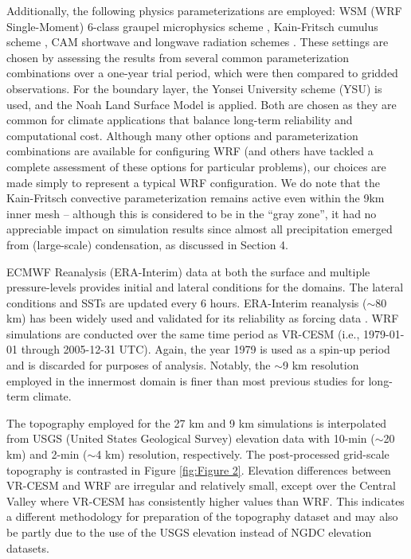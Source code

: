 Additionally, the following physics parameterizations are employed: WSM (WRF Single-Moment) 6-class graupel microphysics scheme \cite{hong2006wrf}, Kain-Fritsch cumulus scheme \cite{kain2004kain}, CAM shortwave and longwave radiation schemes \cite{collins2004description}.  These settings are chosen by assessing the results from several common parameterization combinations over a one-year trial period, which were then compared to gridded observations. For the boundary layer, the Yonsei University scheme (YSU) \cite{hong2006new} is used, and the Noah Land Surface Model \cite{chen2001coupling} is applied. Both are chosen as they are common for climate applications that balance long-term reliability and computational cost.  Although many other options and parameterization combinations are available for configuring WRF (and others have tackled a complete assessment of these options for particular problems), our choices are made simply to represent a typical WRF configuration. We do note that the Kain-Fritsch convective parameterization remains active even within the 9km inner mesh -- although this is considered to be in the ``gray zone'', it had no appreciable impact on  simulation results since almost all precipitation emerged from (large-scale) condensation, as discussed in Section 4.

ECMWF Reanalysis (ERA-Interim) data at both the surface and multiple pressure-levels provides initial and lateral conditions for the domains. The lateral conditions and SSTs are updated every 6 hours. ERA-Interim reanalysis ($\sim$80 km) has been widely used and validated for its reliability as forcing data \cite{dee2011era}. WRF simulations are conducted over the same time period as VR-CESM (i.e., 1979-01-01 through 2005-12-31 UTC). Again, the year 1979 is used as a spin-up period and is discarded for purposes of analysis. Notably, the $\sim$9 km resolution employed in the innermost domain is finer than most previous studies for long-term climate.

The topography employed for the 27 km and 9 km simulations is interpolated from USGS (United States Geological Survey) elevation data with 10-min ($\sim$20 km) and 2-min ($\sim$4 km) resolution, respectively. The post-processed grid-scale topography is contrasted in Figure \ref{fig:Figure 2}. Elevation differences between VR-CESM and WRF are irregular and relatively small, except over the Central Valley where VR-CESM has consistently higher values than WRF. This indicates a different methodology for preparation of the topography dataset and may also be partly due to the use of the USGS elevation instead of NGDC elevation datasets. 

